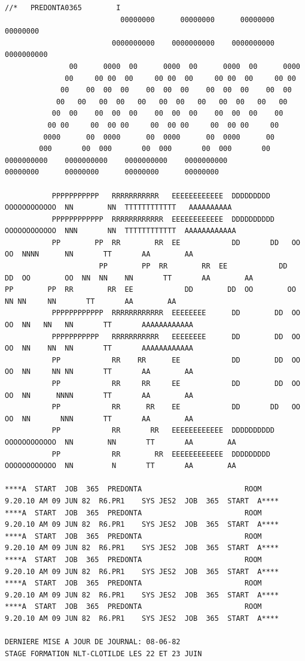 {\fontsize{5}{6}\selectfont
\begin{verbatim}
//*   PREDONTA0365        I
                           00000000      00000000      00000000      00000000
                         0000000000    0000000000    0000000000    0000000000
               00      0000  00      0000  00      0000  00      0000
              00     00 00  00     00 00  00     00 00  00     00 00
             00    00  00  00    00  00  00    00  00  00    00  00
            00   00   00  00   00   00  00   00   00  00   00   00
           00  00    00  00  00    00  00  00    00  00  00    00
          00 00     00  00 00     00  00 00     00  00 00     00
         0000      00  0000      00  0000      00  0000      00
        000       00  000       00  000       00  000       00
0000000000    0000000000    0000000000    0000000000
00000000      00000000      00000000      00000000

           PPPPPPPPPPP   RRRRRRRRRRR   EEEEEEEEEEEE  DDDDDDDDD     OOOOOOOOOOOO  NN        NN  TTTTTTTTTTTT   AAAAAAAAAA
           PPPPPPPPPPPP  RRRRRRRRRRRR  EEEEEEEEEEEE  DDDDDDDDDD    OOOOOOOOOOOO  NNN       NN  TTTTTTTTTTTT  AAAAAAAAAAAA
           PP        PP  RR        RR  EE            DD       DD   OO        OO  NNNN      NN       TT       AA        AA
                      PP        PP  RR        RR  EE            DD        DD  OO        OO  NN  NN    NN       TT       AA        AA
PP        PP  RR        RR  EE            DD        DD  OO        OO  NN NN     NN       TT       AA        AA
           PPPPPPPPPPPP  RRRRRRRRRRRR  EEEEEEEE      DD        DD  OO        OO  NN   NN   NN       TT       AAAAAAAAAAAA
           PPPPPPPPPPP   RRRRRRRRRRR   EEEEEEEE      DD        DD  OO        OO  NN    NN  NN       TT       AAAAAAAAAAAA
           PP            RR    RR      EE            DD        DD  OO        OO  NN     NN NN       TT       AA        AA
           PP            RR     RR     EE            DD        DD  OO        OO  NN      NNNN       TT       AA        AA
           PP            RR      RR    EE            DD       DD   OO        OO  NN       NNN       TT       AA        AA
           PP            RR       RR   EEEEEEEEEEEE  DDDDDDDDDD    OOOOOOOOOOOO  NN        NN       TT       AA        AA
           PP            RR        RR  EEEEEEEEEEEE  DDDDDDDDD     OOOOOOOOOOOO  NN         N       TT       AA        AA

****A  START  JOB  365  PREDONTA                        ROOM        9.20.10 AM 09 JUN 82  R6.PR1    SYS JES2  JOB  365  START  A****
****A  START  JOB  365  PREDONTA                        ROOM        9.20.10 AM 09 JUN 82  R6.PR1    SYS JES2  JOB  365  START  A****
****A  START  JOB  365  PREDONTA                        ROOM        9.20.10 AM 09 JUN 82  R6.PR1    SYS JES2  JOB  365  START  A****
****A  START  JOB  365  PREDONTA                        ROOM        9.20.10 AM 09 JUN 82  R6.PR1    SYS JES2  JOB  365  START  A****
****A  START  JOB  365  PREDONTA                        ROOM        9.20.10 AM 09 JUN 82  R6.PR1    SYS JES2  JOB  365  START  A****
****A  START  JOB  365  PREDONTA                        ROOM        9.20.10 AM 09 JUN 82  R6.PR1    SYS JES2  JOB  365  START  A****

DERNIERE MISE A JOUR DE JOURNAL: 08-06-82
STAGE FORMATION NLT-CLOTILDE LES 22 ET 23 JUIN
\end{verbatim}
}
